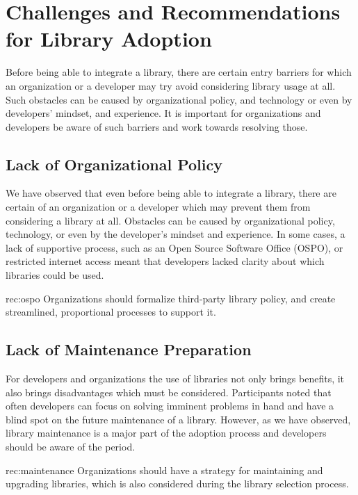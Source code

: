 
\section{Challenges and Recommendations for Library Adoption}
Before being able to integrate a library, there are certain entry barriers for which an organization or a developer may try avoid considering library usage at all. Such obstacles can be caused by organizational policy, and technology or even by developers' mindset, and experience. It is important for organizations and developers be aware of such barriers and work towards resolving those.

\subsection{Lack of Organizational Policy}
We have observed that even before being able to integrate a library, there are certain   of an organization or a developer which may prevent them from considering a library at all. Obstacles can be caused by organizational policy, technology, or even by the developer's mindset and experience. In some cases, a lack of supportive process, such as an Open Source Software Office (OSPO), or restricted internet access meant that developers lacked clarity about which libraries could be used. 
\begin{recommendation}{rec:ospo}
  {Organizations should formalize 
third-party library policy, and create streamlined, proportional processes to support it.}
\end{recommendation}\medskip

\subsection{Lack of Maintenance Preparation}
For developers and organizations the use of libraries not only brings benefits, it also brings disadvantages which must be considered. Participants noted that often developers can focus on solving imminent problems in hand and have a blind spot on the future maintenance of a library. However, as we have observed, library maintenance is a major part of the adoption process and developers should be aware of the  period. 
\begin{recommendation}{rec:maintenance}
  {Organizations should have a strategy for maintaining and upgrading libraries, which is also considered during the library selection process.}
\end{recommendation}\medskip

